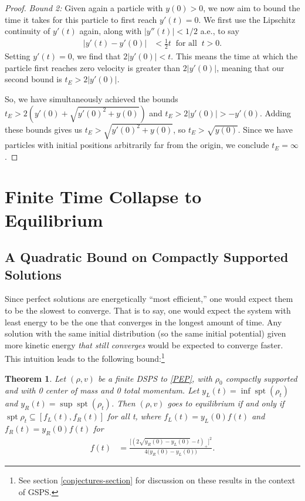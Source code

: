 \documentclass[11pt]{article}
\newtheorem{theorem}{Theorem}[section]
\numberwithin{equation}{section}
\DeclareMathOperator{\spt}{spt}
\begin{document}
\begin{proof}
            \textit{Bound 2:} Given again a particle with $y(0) > 0$, we now aim to bound the time it takes for this particle to first reach $y'(t)=0$. We first use the Lipschitz continuity of $y'(t)$ again, along with $|y''(t)|<1/2$ a.e., to say
            \begin{align*}
                \left|y'(t)-y'(0)\right|&<\frac{1}{2}t\ \mbox{ for all }\ t>0.
            \end{align*}
            Setting $y'(t) = 0$, we find that $2\left|y'(0)\right| <t$. This means the time at which the particle first reaches zero velocity is greater than $2\left|y'(0)\right|$, meaning that our second bound is $t_E > 2\left|y'(0)\right|$.
            
            So, we have simultaneously achieved the bounds $t_E > 2\left(y'(0) + \sqrt{y'(0)^2+y(0)}\right)$ and $t_E > 2\left|y'(0)\right| > -y'(0)$. Adding these bounds gives us $t_E>\sqrt{y'(0)^2+y(0)}$, so $t_E>\sqrt{y(0)}$. Since we have particles with initial positions arbitrarily far from the origin, we conclude $t_E=\infty$. 
            \end{proof}
\section{Finite Time Collapse to Equilibrium}
    \subsection{A Quadratic Bound on Compactly Supported Solutions}\label{quadratic-section}
    
        Since perfect solutions are energetically ``most efficient,'' one would expect them to be the slowest to converge. That is to say, one would expect the system with least energy to be the one that converges in the longest amount of time. Any solution with the same initial distribution (so the same initial potential) given more kinetic energy \textit{that still converges} would be expected to converge faster. This intuition leads to the following bound:\footnote{See section \ref{conjectures-section} for discussion on these results in the context of GSPS.}
    
        \begin{theorem}\label{quad-envelope}
            Let $(\rho,v)$ be a finite DSPS to \eqref{PEP}, with $\rho_0$ compactly supported and with 0 center of mass and 0 total momentum. Let $y_L(t)=\inf\spt(\rho_t)$ and $y_R(t)=\sup\spt(\rho_t)$. Then $(\rho,v)$ goes to equilibrium if and only if $\spt \rho_t \subseteq [f_L(t),f_R(t)]$ for all t, where $f_L(t)=y_L(0)f(t)$ and $f_R(t)=y_R(0)f(t)$ for
            \begin{align}\label{quad-envelope1}
                f(t)&=\frac{\bigg[\left(2\sqrt{y_R(0)-y_L(0)}-t\right)_+\bigg]^2}{4\big(y_R(0)-y_L(0)\big)}.
            \end{align} 
        \end{theorem}
\end{document}
